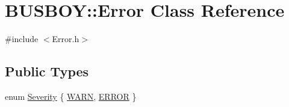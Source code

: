 \hypertarget{classBUSBOY_1_1Error}{
\section{BUSBOY::Error Class Reference}
\label{classBUSBOY_1_1Error}
}


{\ttfamily \#include $<$Error.h$>$}\subsection*{Public Types}
\begin{DoxyCompactItemize}
\item 
enum \hyperlink{classBUSBOY_1_1Error_a999444a8876433731c3d2e824d4c23e4}{Severity} \{ \hyperlink{classBUSBOY_1_1Error_a999444a8876433731c3d2e824d4c23e4af2ae2960567ee543590295810f6d5a42}{WARN}, 
\hyperlink{classBUSBOY_1_1Error_a999444a8876433731c3d2e824d4c23e4ad5def28eef2a0448eb28e4e313b3cddb}{ERROR}
 \}
\end{DoxyCompactItemize}
